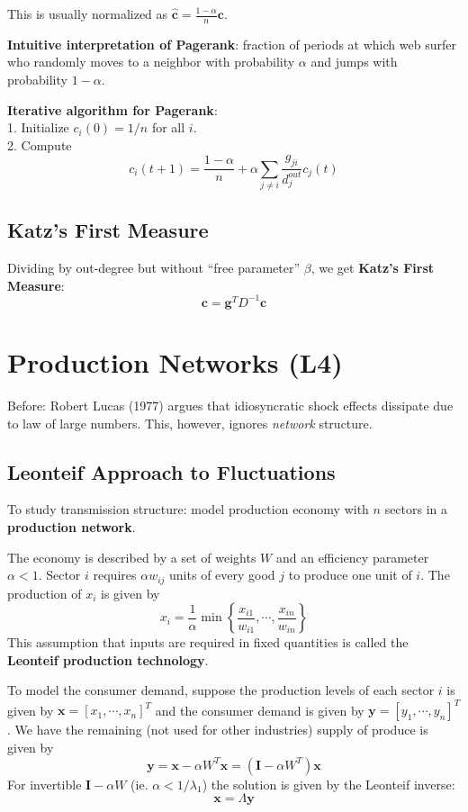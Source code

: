 \documentclass[9pt]{article}
\begin{document}
\begin{multicols}{2}
This is usually normalized as $\hat{\mathbf{c}} = \frac{1-\alpha}{n}\mathbf{c}$.

\textbf{Intuitive interpretation of Pagerank}: fraction of periods at which
web surfer who randomly moves to a neighbor with probability $\alpha$ and jumps with probability $1-\alpha$.

\textbf{Iterative algorithm for Pagerank}: \\
1. Initialize $c_i(0)=1/n$ for all $i$. \\
2. Compute 
\begin{equation}
c_{i}(t+1)=\frac{1-\alpha}{n}+\alpha\sum_{j \ne i}\frac{g_{ji}}{d_{j}^{out}}c_{j}(t)
\end{equation}

\subsection{Katz's First Measure}

Dividing by out-degree but without ``free parameter'' $\beta$, we get \textbf{Katz's First Measure}: $$\mathbf{c}=\mathbf{g}^{T}D^{-1}\mathbf{c}$$

\section{Production Networks (L4)}

Before: Robert Lucas (1977) argues that idiosyncratic shock effects
dissipate due to law of large numbers. This, however, ignores
\textit{network} structure.

\subsection{Leonteif Approach to Fluctuations}
To study transmission structure: model production economy with 
$n$ sectors in a \textbf{production network}. 

The economy is described by a set of weights $W$ and an efficiency
parameter $\alpha < 1$. Sector $i$ requires $\alpha w_{ij}$ units
of every good $j$ to produce one unit of $i$. The production of 
$x_i$ is given by 
\begin{equation}
x_i = \frac{1}{\alpha}\min\left\{\frac{x_{i1}}{w_{i1}}, \cdots,\frac{x_{in}}{w_{in}}\right\}
\end{equation}
This assumption that inputs are required in fixed quantities is 
called the \textbf{Leonteif production technology}.

To model the consumer demand, suppose the production levels of each
sector $i$ is given by $\mathbf{x}=[x_1,\cdots,x_n]^{T}$ and 
the consumer demand is given by $\mathbf{y}=[y_1,\cdots,y_n]^{T}$. 
We have the remaining (not used for other industries) supply of 
produce is given by
\begin{equation}
    \mathbf{y}=\mathbf{x}-\alpha W^{T}\mathbf{x}=(\mathbf{I}-\alpha{W}^{T})\mathbf{x}
\end{equation}
For invertible $\mathbf{I}-\alpha W$ (ie. $\alpha < 1/\lambda_1$) the solution
is given by the Leonteif inverse: 
\begin{equation}
    \mathbf{x} = \Lambda \mathbf{y}
\end{equation}


\end{multicols}
\end{document}
